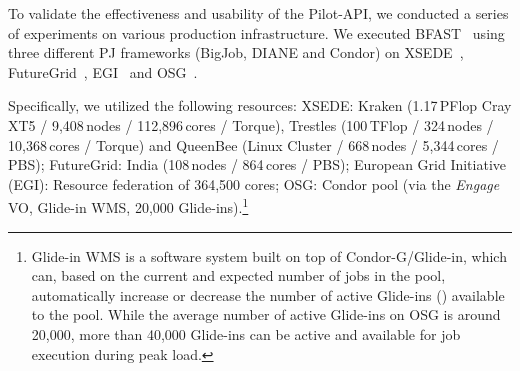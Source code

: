 \documentclass[conference]{IEEEtran}
\begin{document}
To validate the effectiveness and usability of the Pilot-API, we
conducted a series of experiments on various production infrastructure. We
executed BFAST~\cite{bfast2009} using three different PJ frameworks (BigJob,
DIANE and Condor) on XSEDE~\cite{xsede}, FutureGrid~\cite{fg}, EGI~\cite{egi}
and OSG~\cite{1742-6596-78-1-012057}.

Specifically, we utilized the following resources: XSEDE: Kraken (1.17\,PFlop 
Cray XT5 / 9,408\,nodes / 112,896\,cores / Torque), Trestles 
(100\,TFlop / 324\,nodes / 10,368\,cores / Torque) and QueenBee
(Linux Cluster / 668\,nodes / 5,344\,cores / PBS); FutureGrid:
India (108\,nodes / 864\,cores / PBS);  European Grid
Initiative (EGI): Resource federation of 364,500 cores;
OSG: Condor pool (via the \textit{Engage} VO, Glide-in WMS,
20,000 Glide-ins).\footnote{Glide-in WMS is a software system built on
top of Condor-G/Glide-in, which can, based on the current and expected
number of jobs in the pool,  automatically increase or decrease the
number of active Glide-ins (\pilots) available to the pool.  While the
average number of active Glide-ins on OSG is around 20,000, more than
40,000 Glide-ins can be active and available for job execution during
peak load.}

 
\end{document}
